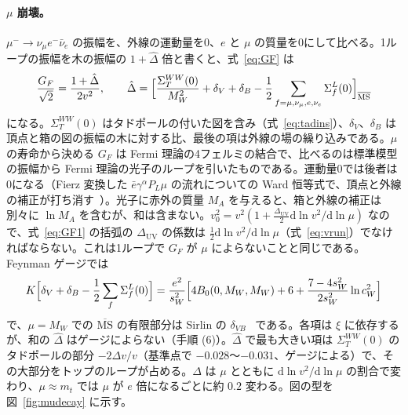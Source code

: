 \documentclass[a4paper,10pt]{ltjsarticle}
\newcommand{\dd}{\mathrm{d}}
\newcommand{\MSbar}{\overline{\mathrm{MS}}}
\newcommand{\DUV}{\Delta_{\mathrm{UV}}}
\newcommand{\sw}{s_W}
\newcommand{\cw}{c_W}
\begin{document}
\paragraph{$\mu$ 崩壊。}$\mu^-\to\nu_\mu e^-\bar\nu_e$ の振幅を、外線の運動量を0、$e$ と $\mu$ の質量を0にして比べる。1ループの振幅を木の振幅の $1+\hat\Delta$ 倍と書くと、式~\eqref{eq:GF} は
\begin{equation}
\frac{G_F}{\sqrt2}=\frac{1+\hat\Delta}{2v^2},\qquad
\hat\Delta=\Bigl[\frac{\Sigma^{WW}_T(0)}{M_W^2}+\delta_V+\delta_B-\frac12\sum_{f=\mu,\nu_\mu,e,\nu_e}\Sigma^L_f(0)\Bigr]_{\MSbar}
\label{eq:GF1}
\end{equation}
になる。$\Sigma^{WW}_T(0)$ はタドポールの付いた図を含み（式~\eqref{eq:tadins}）、$\delta_V$、$\delta_B$ は頂点と箱の図の振幅の木に対する比、最後の項は外線の場の繰り込みである。$\mu$ の寿命から決める $G_F$ は Fermi 理論の4フェルミの結合で、比べるのは標準模型の振幅から Fermi 理論の光子のループを引いたものである。運動量0では後者は0になる（Fierz 変換した $\bar e\gamma^\alpha P_L\mu$ の流れについての Ward 恒等式で、頂点と外線の補正が打ち消す~\cite{sirlin80}）。光子に赤外の質量 $M_A$ を与えると、箱と外線の補正は別々に $\ln M_A$ を含むが、和は含まない。$v_0^2=v^2(1+\frac{\DUV}2\dd\ln v^2/\dd\ln\mu)$ なので、式~\eqref{eq:GF1} の括弧の $\DUV$ の係数は $\frac12\dd\ln v^2/\dd\ln\mu$（式~\eqref{eq:vrun}）でなければならない。これは1ループで $G_F$ が $\mu$ によらないことと同じである。Feynman ゲージでは
\begin{equation}
K\Bigl[\delta_V+\delta_B-\frac12\sum_f\Sigma^L_f(0)\Bigr]=\frac{e^2}{\sw^2}\Bigl[4B_0(0,M_W,M_W)+6+\frac{7-4\sw^2}{2\sw^2}\ln\cw^2\Bigr]
\label{eq:dVB}
\end{equation}
で、$\mu=M_W$ での $\MSbar$ の有限部分は Sirlin の $\delta_{VB}$~\cite{sirlin80,denner93} である。各項は $\xi$ に依存するが、和の $\hat\Delta$ はゲージによらない（手順 (6)）。$\hat\Delta$ で最も大きい項は $\Sigma^{WW}_T(0)$ のタドポールの部分 $-2\Delta v/v$（基準点で $-0.028$〜$-0.031$、ゲージによる）で、その大部分をトップのループが占める。$\hat\Delta$ は $\mu$ とともに $\dd\ln v^2/\dd\ln\mu$ の割合で変わり、$\mu\approx m_t$ では $\mu$ が $e$ 倍になるごとに約 $0.2$ 変わる。図の型を図~\ref{fig:mudecay} に示す。
\end{document}
